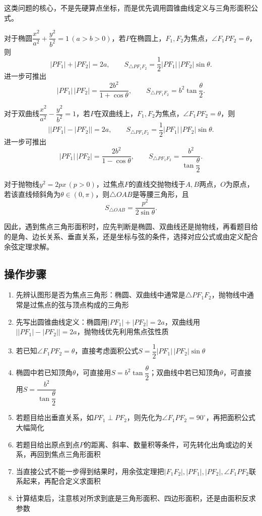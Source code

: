 \documentclass[UTF8,a4paper,11pt]{ctexart}
\begin{document}
这类问题的核心，不是先硬算点坐标，而是优先调用圆锥曲线定义与三角形面积公式。

对于椭圆$\dfrac{x^2}{a^2}+\dfrac{y^2}{b^2}=1\,(a>b>0)$，若$P$在椭圆上，$F_1,F_2$为焦点，$\angle F_1PF_2=\theta$，则
\[
|PF_1|+|PF_2|=2a,
\qquad
S_{\triangle PF_1F_2}=\frac12|PF_1|\,|PF_2|\sin\theta.
\]
进一步可推出
\[
|PF_1|\,|PF_2|=\frac{2b^2}{1+\cos\theta},
\qquad
S_{\triangle PF_1F_2}=b^2\tan\frac{\theta}{2}.
\]

对于双曲线$\dfrac{x^2}{a^2}-\dfrac{y^2}{b^2}=1$，若$P$在双曲线上，$F_1,F_2$为焦点，$\angle F_1PF_2=\theta$，则
\[
\bigl||PF_1|-|PF_2|\bigr|=2a,
\qquad
S_{\triangle PF_1F_2}=\frac12|PF_1|\,|PF_2|\sin\theta.
\]
进一步可推出
\[
|PF_1|\,|PF_2|=\frac{2b^2}{1-\cos\theta},
\qquad
S_{\triangle PF_1F_2}=\frac{b^2}{\tan\dfrac{\theta}{2}}.
\]

对于抛物线$y^2=2px\,(p>0)$，过焦点$F$的直线交抛物线于$A,B$两点，$O$为原点，若该直线倾斜角为$\theta\in(0,\pi)$，则$\triangle OAB$是等腰三角形，且
\[
S_{\triangle OAB}=\frac{p^2}{2\sin\theta}.
\]

因此，遇到焦点三角形面积时，应先判断是椭圆、双曲线还是抛物线，再看题目给的是角、边长关系、垂直关系，还是坐标与弦的条件，选择对应公式或由定义配合余弦定理求解。

\subsection*{操作步骤}

\begin{enumerate}

\item 先辨认图形是否为焦点三角形：椭圆、双曲线中通常是$\triangle PF_1F_2$，抛物线中通常是过焦点的弦与顶点构成的三角形

\item 先写出圆锥曲线定义：椭圆用$|PF_1|+|PF_2|=2a$，双曲线用$\bigl||PF_1|-|PF_2|\bigr|=2a$，抛物线优先利用焦点弦性质

\item 若已知$\angle F_1PF_2=\theta$，直接考虑面积公式$S=\dfrac12|PF_1|\,|PF_2|\sin\theta$

\item 椭圆中若已知顶角$\theta$，可直接用$S=b^2\tan\dfrac{\theta}{2}$；双曲线中若已知顶角$\theta$，可直接用$S=\dfrac{b^2}{\tan\dfrac{\theta}{2}}$

\item 若题目给出垂直关系，如$PF_1\perp PF_2$，则先化为$\angle F_1PF_2=90^\circ$，再把面积公式大幅简化

\item 若题目给出原点到点$P$的距离、斜率、数量积等条件，可先转化出角或边的关系，再回到焦点三角形面积

\item 当直接公式不能一步得到结果时，用余弦定理把$|F_1F_2|,|PF_1|,|PF_2|,\angle F_1PF_2$联系起来，再配合定义求面积

\item 计算结束后，注意核对所求到底是三角形面积、四边形面积，还是由面积反求参数

\end{enumerate}
\end{document}
